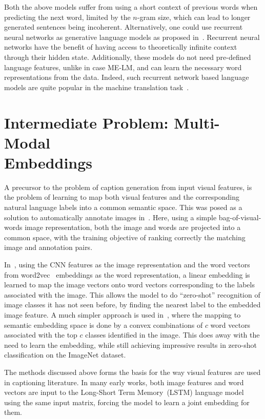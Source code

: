 Both the above models suffer from using a short context of previous words when
predicting the next word, limited by the $n$-gram size, which can lead to longer
generated sentences being incoherent.
Alternatively, one could use recurrent neural networks as generative language
models as proposed in~\cite{mikolov2010recurrent}.
Recurrent neural networks have the benefit of having access to theoretically
infinite context through their hidden state.
Additionally, these models do not need pre-defined language features, unlike in case
ME-LM, and can learn the necessary word representations from the data. 
Indeed, such recurrent network based language models are quite popular in
the machine translation task~\cite{bahdanau2014neural}.

\section{Intermediate Problem: Multi-Modal \\Embeddings}
A precursor to the problem of caption generation from input visual features, is
the problem of learning to map both visual features and the corresponding
natural language labels into a common semantic space.
This was posed as a solution to automatically annotate images
in~\cite{weston2010large}.
Here, using a simple bag-of-visual-words image representation, both the image
and words are projected into a common space, with the training objective of
ranking correctly the matching image and annotation pairs. 

In~\cite{frome2013devise}, using the CNN features as the image representation
and the word vectors from word2vec~\cite{mikolov2013distributed} embeddings as
the word representation, a linear embedding is learned to map the image vectors
onto word vectors corresponding to the labels associated with the image.
This allows the model to do ``zero-shot'' recognition of image classes it has
not seen before, by finding the nearest label to the embedded image feature.
A much simpler approach is used in~\cite{norouzi2013zero}, where the mapping to
semantic embedding space is done by a convex combinations of $c$ word vectors
associated with the top $c$ classes identified in the image.
This does away with the need to learn the embedding, while still achieving
impressive results in zero-shot classification on the ImageNet dataset.

The methods discussed above forms the basis for the way visual features are used
in captioning literature.
In many early works, both image features and word vectors are input to the
Long-Short Term Memory~(LSTM) language model using the same input matrix,
forcing the model to learn a joint embedding for them.

